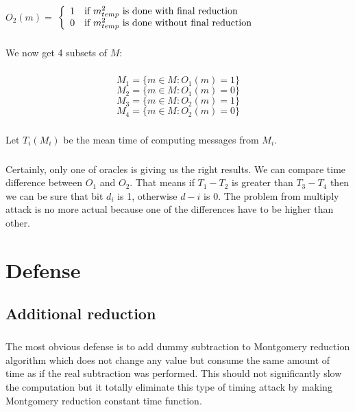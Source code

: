 \documentclass[thesis=B,english]{FITthesis}[2012/10/20]
\begin{document}
\paragraph*{}
\( O_2(m) =\) $\left\{
  \begin{array}{cl}
    \text{1} & \text{\mbox{if}  \(m_{temp}^2\) is done with final reduction} \\
    \text{0} & \text{\mbox{if}  \(m_{temp}^2\) is done without final reduction} 
  \end{array}
\right.$

\paragraph*{}{
We now get 4 subsets of \(M\):
}
\paragraph*{}
\[M_1 = \{m \in M : O_1(m) = 1\}\]
\[M_2 = \{m \in M : O_1(m) = 0\}\]
\[M_3 = \{m \in M : O_2(m) = 1\}\]
\[M_4 = \{m \in M : O_2(m) = 0\}\]

\paragraph*{}
{Let \(T_i(M_i)\) be the mean time of computing messages from \(M_i\). }


\paragraph*{}{
Certainly, only one of oracles is giving us the right results. We can compare time difference between \( O_1 \) and \(O_2\). That means if \(T_1 - T_2 \) is greater than 
\(T_3 - T_4\) then we can be sure that bit \(d_i\) is 1, otherwise \(d-i\) is 0. The problem from multiply attack is no more actual because one of the differences have to be higher
than other.
}


\chapter{Defense}
\section{Additional reduction}
\paragraph*{}{
The most obvious defense is to add dummy subtraction to Montgomery reduction algorithm which does not change any value but consume the same amount of time as if the real subtraction
was performed. This should not significantly slow the computation but it totally eliminate this type of timing attack by making Montgomery reduction constant time function.
}
\end{document}
